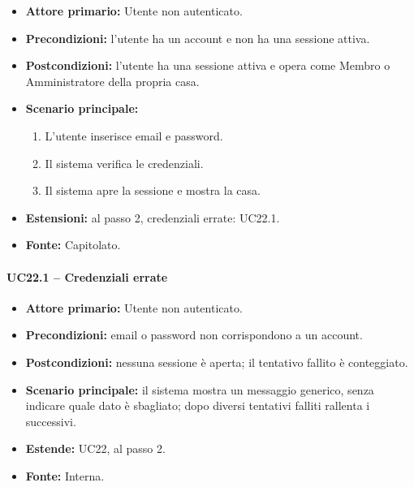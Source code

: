 \documentclass[12pt,a4paper]{article}
\newcommand{\tightlist}{\setlength{\itemsep}{1pt}\setlength{\parskip}{0pt}}
\begin{document}
\begin{itemize}

\tightlist

\item \textbf{Attore primario:} Utente non autenticato.

\item \textbf{Precondizioni:} l'utente ha un account e non ha una sessione attiva.

\item \textbf{Postcondizioni:} l'utente ha una sessione attiva e opera come Membro o Amministratore della propria casa.

\item \textbf{Scenario principale:}

\begin{enumerate}

\tightlist

\item L'utente inserisce email e password.

\item Il sistema verifica le credenziali.

\item Il sistema apre la sessione e mostra la casa.

\end{enumerate}

\item \textbf{Estensioni:} al passo 2, credenziali errate: UC22.1.

\item \textbf{Fonte:} Capitolato.

\end{itemize}



\paragraph{UC22.1 -- Credenziali errate}

\begin{itemize}

\tightlist

\item \textbf{Attore primario:} Utente non autenticato.

\item \textbf{Precondizioni:} email o password non corrispondono a un account.

\item \textbf{Postcondizioni:} nessuna sessione è aperta; il tentativo fallito è conteggiato.

\item \textbf{Scenario principale:} il sistema mostra un messaggio generico, senza indicare quale dato è sbagliato; dopo diversi tentativi falliti rallenta i successivi.

\item \textbf{Estende:} UC22, al passo 2.

\item \textbf{Fonte:} Interna.

\end{itemize}
\end{document}
